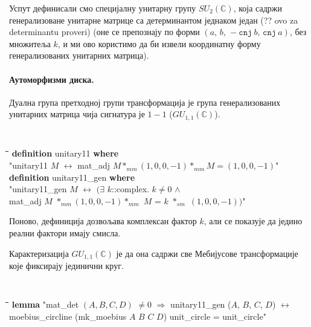 Успут дефинисали смо специјалну унитарну групу $SU_2(\mathbb{C})$,
која садржи генерализоване унитарне матрице са детерминантом једнаком
један (?? ovo za determinantu proveri) (оне се препознају по форми
$(a,\,b,\,-\mathtt{cnj}\ b,\,\mathtt{cnj}\ a)$, без множитеља $k$, и
ми ово користимо да би извели координатну форму генерализованих
унитарних матрица).


\paragraph{Аутоморфизми диска.}
Дуална група претходној групи трансформација је група генерализованих
унитарних матрица чија сигнатура је $1-1$ ($GU_{1,1}(\mathbb{C})$).

{\tt
  \begin{tabbing}
    \hspace{5mm}\=\hspace{5mm}\=\hspace{5mm}\=\hspace{5mm}\=\hspace{5mm}\=\kill
{\bf definition} unitary11 {\bf where}\\
\>"unitary11 $M$ $\longleftrightarrow$ mat\_adj $M *_{mm} (1, 0, 0, -1) *_{mm} M = (1, 0, 0, -1)$"\\
{\bf definition} unitary11\_gen {\bf where}\\
\>"unitary11\_gen $M$ $\longleftrightarrow$ $(\exists$ $k$::complex. $k \neq 0$ $\wedge$\\
\>\>mat\_adj $M$ $*_{mm} (1, 0, 0, -1) *_{mm}$ $M$ = $k$ $*_{sm}$ $(1, 0, 0, -1)$$)$"
  \end{tabbing}
}
\noindent Поново, дефиниција дозвољава комплексан фактор $k$, 
али се показује да једино реални фактори имају смисла.

Карактеризација $GU_{1,1}(\mathbb{C})$ је да она садржи све Мебијусове
трансформације које фиксирају јединични круг.

{\tt
  \begin{tabbing}
    \hspace{5mm}\=\hspace{5mm}\=\hspace{5mm}\=\hspace{5mm}\=\hspace{5mm}\=\kill
{\bf lemma} "mat\_det $(A, B, C, D)$ $\neq 0$ $\Longrightarrow$ unitary11\_gen ($A$, $B$, $C$, $D$)  $\longleftrightarrow$\\
\>moebius\_circline (mk\_moebius $A$ $B$ $C$ $D$) unit\_circle = unit\_circle"
  \end{tabbing}
}

